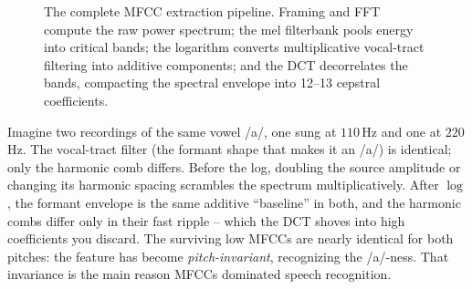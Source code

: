 \begin{figure}[H]
\centering
{}
\caption{The complete MFCC extraction pipeline. Framing and FFT compute the raw power spectrum; the mel filterbank pools energy into critical bands; the logarithm converts multiplicative vocal-tract filtering into additive components; and the DCT decorrelates the bands, compacting the spectral envelope into 12--13 cepstral coefficients.}
\label{ch27:fig-mfcc-pipeline}
\end{figure}

\begin{example}
\label{ch27:ex-log}
Imagine two recordings of the same vowel /a/, one sung at $110$\,Hz and one at
$220$\,Hz. The vocal-tract filter (the formant shape that makes it an /a/) is
identical; only the harmonic comb differs. Before the log, doubling the source
amplitude or changing its harmonic spacing scrambles the spectrum
multiplicatively. After $\log$, the formant envelope is the same additive
``baseline'' in both, and the harmonic combs differ only in their fast ripple --
which the DCT shoves into high coefficients you discard. The surviving low MFCCs
are nearly identical for both pitches: the feature has become
\emph{pitch-invariant}, recognizing the /a/-ness. That invariance is the main
reason MFCCs dominated speech recognition.
\end{example}

